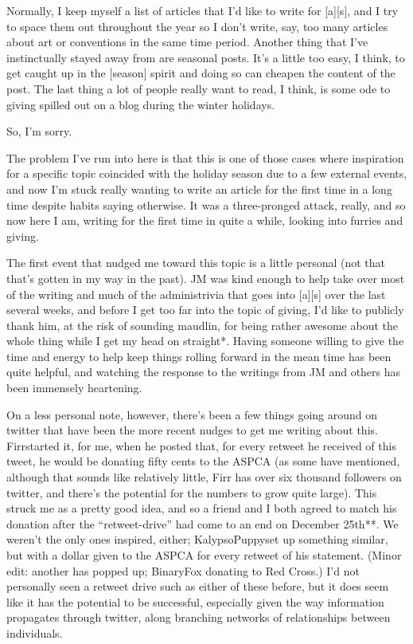 
Normally, I keep myself a list of articles that I'd like to write for {[}a{]}{[}s{]}, and I try to space them out throughout the year so I don't write, say, too many articles about art or conventions in the same time period. Another thing that I've instinctually stayed away from are seasonal posts. It's a little too easy, I think, to get caught up in the {[}season{]} spirit and doing so can cheapen the content of the post. The last thing a lot of people really want to read, I think, is some ode to giving spilled out on a blog during the winter holidays.

So, I'm sorry.

The problem I've run into here is that this is one of those cases where inspiration for a specific topic coincided with the holiday season due to a few external events, and now I'm stuck really wanting to write an article for the first time in a long time despite habits saying otherwise. It was a three-pronged attack, really, and so now here I am, writing for the first time in quite a while, looking into furries and giving.

The first event that nudged me toward this topic is a little personal (not that that's gotten in my way in the past). JM was kind enough to help take over most of the writing and much of the administrivia that goes into {[}a{]}{[}s{]} over the last several weeks, and before I get too far into the topic of giving, I'd like to publicly thank him, at the risk of sounding maudlin, for being rather awesome about the whole thing while I get my head on straight*. Having someone willing to give the time and energy to help keep things rolling forward in the mean time has been quite helpful, and watching the response to the writings from JM and others has been immensely heartening.

On a less personal note, however, there's been a few things going around on twitter that have been the more recent nudges to get me writing about this. Firrstarted it, for me, when he posted that, for every retweet he received of this tweet, he would be donating fifty cents to the ASPCA (as some have mentioned, although that sounds like relatively little, Firr has over six thousand followers on twitter, and there's the potential for the numbers to grow quite large). This struck me as a pretty good idea, and so a friend and I both agreed to match his donation after the ``retweet-drive'' had come to an end on December 25th**. We weren't the only ones inspired, either; KalypsoPuppyset up something similar, but with a dollar given to the ASPCA for every retweet of his statement. (Minor edit: another has popped up; BinaryFox donating to Red Cross.) I'd not personally seen a retweet drive such as either of these before, but it does seem like it has the potential to be successful, especially given the way information propagates through twitter, along branching networks of relationships between individuals.

